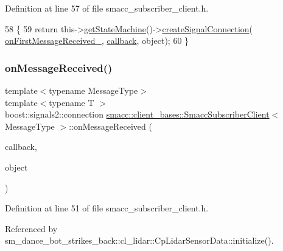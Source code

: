 Definition at line 57 of file smacc\+\_\+subscriber\+\_\+client.\+h.


\begin{DoxyCode}
58   \{
59     \textcolor{keywordflow}{return} this->\hyperlink{classsmacc_1_1ISmaccClient_aec51d4712404cb9882b86e4c854bb93a}{getStateMachine}()->\hyperlink{classsmacc_1_1ISmaccStateMachine_adf0f42ade0c65cc471960fe2a7c42da2}{createSignalConnection}(
      \hyperlink{classsmacc_1_1client__bases_1_1SmaccSubscriberClient_af1ec022065a2df3faabe40768f8b2e22}{onFirstMessageReceived\_}, \hyperlink{servers_2opencv__perception__node_2opencv__perception__node_8cpp_a050e697bd654facce10ea3f6549669b3}{callback}, \textcolor{keywordtype}{object});
60   \}
\end{DoxyCode}
\mbox{\label{classsmacc_1_1client__bases_1_1SmaccSubscriberClient_a4f02251e3a161fb6d802b154b1081f18}} 
\subsubsection{\texorpdfstring{on\+Message\+Received()}{onMessageReceived()}}
{\footnotesize\ttfamily template$<$typename Message\+Type$>$ \\
template$<$typename T $>$ \\
boost\+::signals2\+::connection \hyperlink{classsmacc_1_1client__bases_1_1SmaccSubscriberClient}{smacc\+::client\+\_\+bases\+::\+Smacc\+Subscriber\+Client}$<$ Message\+Type $>$\+::on\+Message\+Received (\begin{DoxyParamCaption}\item[{void(T\+::$\ast$)(const Message\+Type \&)}]{callback,  }\item[{T $\ast$}]{object }\end{DoxyParamCaption})\hspace{0.3cm}{\ttfamily [inline]}}



Definition at line 51 of file smacc\+\_\+subscriber\+\_\+client.\+h.



Referenced by sm\+\_\+dance\+\_\+bot\+\_\+strikes\+\_\+back\+::cl\+\_\+lidar\+::\+Cp\+Lidar\+Sensor\+Data\+::initialize().



